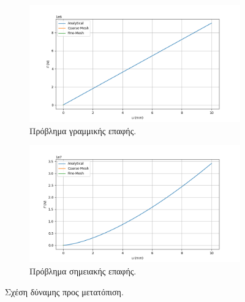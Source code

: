 \documentclass{article}
\begin{document}
\begin{figure}[H]
    \centering
    \begin{subfigure}{0.49\linewidth}
        \centering
        \includegraphics[width=\linewidth]{media/flin.png}
        \caption{Πρόβλημα γραμμικής επαφής.}
    \end{subfigure}
    \hfill
    \begin{subfigure}{0.49\linewidth}
        \centering
        \includegraphics[width=\linewidth]{media/fp.png}
        \caption{Πρόβλημα σημειακής επαφής.}
    \end{subfigure}
    \caption{Σχέση δύναμης προς μετατόπιση.}
    \label{fig:b2}
\end{figure}
\end{document}
